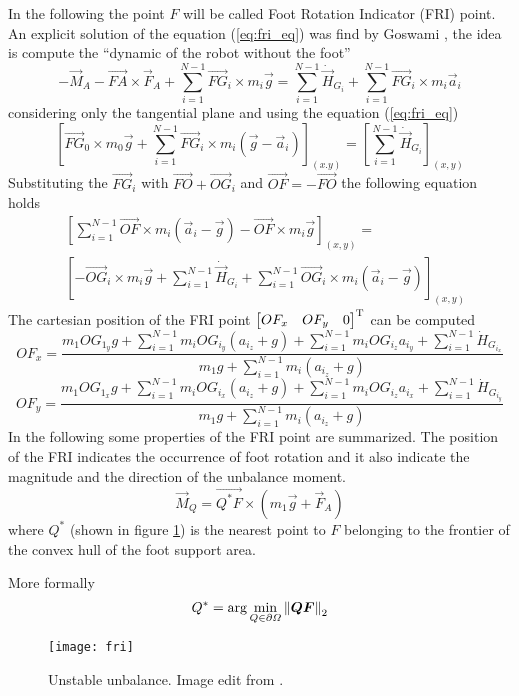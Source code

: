 In the following the point $F$ will be called Foot Rotation Indicator (FRI) point.
An explicit solution of the equation (\ref{eq:fri_eq}) was find by Goswami \cite{Goswami1999},
the idea is compute the ``dynamic of the robot without the foot''
\[
-\vec{M}_A - \vec{FA} \times \vec{F}_A + \sum_{i=1}^{N-1} {\vec{FG}_i \times m_i \vec{g}} = \sum_{i=1}^{N-1}
\dot{\vec{H}}_{G_i} + \sum_{i=1}^{N-1} {\vec{FG}_i \times m_i \vec{a}_i}
\]
considering only the tangential plane and using the equation (\ref{eq:fri_eq})
\[
\left[\vec{FG}_0 \times m_0 \vec{g} + \sum_{i=1}^{N-1}\vec{FG}_i \times m_i (\vec{g}-\vec{a}_i)\right]_{(x.y)} = \left[ \sum_{i=1}^{N-1} \dot{\vec{H}}_{G_i} \right]_{(x,y)}
\]
Substituting the $\vec{FG}_i$ with $\vec{FO} + \vec{OG}_i$ and $\vec{OF} = -\vec{FO}$ the following
equation holds
\[
\begin{split}
  & \left[ \sum_{i=1}^{N-1} \vec{OF} \times m_i (\vec{a}_i - \vec{g}) -  \vec{OF} \times m_i \vec{g} \right]_{(x,y)} =\\
 & \left[ -\vec{OG}_i \times m_i \vec{g} + \sum_{i=1}^{N-1} \dot{\vec{H}}_{G_i} + \sum_{i=1}^{N-1} \vec{OG}_i \times m_i (\vec{a}_i - \vec{g})  \right]_{(x,y)}
\end{split}
\]
The cartesian position of the FRI point $\begin{bmatrix}OF_x & OF_y & 0 \end{bmatrix} ^{\mathrm{T}}$
can be computed
\[
OF_x = \frac{m_1 OG_{1_y} g + \sum_{i=1}^{N-1} m_i OG_{i_y}(a_{i_z} + g) + \sum_{i=1}^{N-1} m_i OG_{i_z} a_{i_y} + \sum_{i=1}^{N-1} \dot{H}_{G_{i_x}}}{m_1 g + \sum_{i=1}^{N-1} m_i ( a_{i_z} + g)}
\]
\[
OF_y = \frac{m_1 OG_{1_x} g + \sum_{i=1}^{N-1} m_i OG_{i_x}(a_{i_z} + g) + \sum_{i=1}^{N-1} m_i OG_{i_z} a_{i_x} + \sum_{i=1}^{N-1} \dot{H}_{G_{i_y}}}{m_1 g + \sum_{i=1}^{N-1} m_i ( a_{i_z} + g)}
\]
In the following some properties of the FRI point are summarized.
The position of the FRI indicates the occurrence of foot rotation and it also indicate the magnitude
and the direction of the unbalance moment.
\[
\vec{M}_{Q} = \vec{Q^*F} \times (m_1 \vec{g} + \vec{F}_A)
\]
where $Q^*$ (shown in figure \ref{fig:fri}) is the nearest point to $F$  belonging to the frontier of
the convex hull of the foot support area.
\par
More formally
\[
Q^* = \arg \min_{Q \in \partial \Omega}\left\lVert\boldsymbol{QF}\right\rVert_2
\]
\begin{figure}[!ht]
  \centering
  \texttt{[image: fri]}
  \caption{Unstable unbalance. Image edit from \cite{Vukobratov2004}. \label{fig:fri}}
\end{figure}
